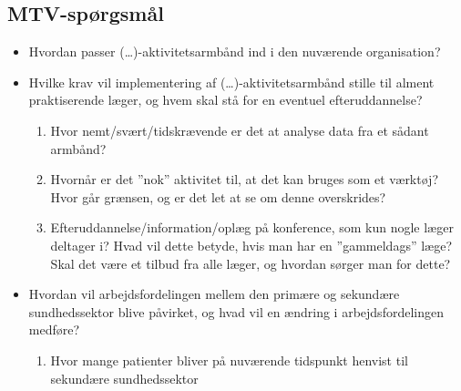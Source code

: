 \subsection{MTV-spørgsmål}
\begin{itemize}
\item Hvordan passer  (…)-aktivitetsarmbånd ind i den nuværende organisation? 
\item Hvilke krav vil implementering af (…)-aktivitetsarmbånd stille til alment praktiserende læger, og hvem skal stå for en eventuel efteruddannelse? 
\begin{enumerate}
\item Hvor nemt/svært/tidskrævende er det at analyse data fra et sådant armbånd?
\item Hvornår er det ”nok” aktivitet til, at det kan bruges som et værktøj? Hvor går grænsen, og er det let at se om denne overskrides? 
\item Efteruddannelse/information/oplæg på konference, som kun nogle læger deltager i? Hvad vil dette betyde, hvis man har en ”gammeldags” læge?  Skal det være et tilbud fra alle læger, og hvordan sørger man for dette?
\end{enumerate}
\item  Hvordan vil arbejdsfordelingen mellem den primære og sekundære sundhedssektor blive påvirket, og hvad vil en ændring i arbejdsfordelingen medføre?
\begin{enumerate}
\item Hvor mange patienter bliver på nuværende tidspunkt henvist til sekundære sundhedssektor
\end{enumerate} 
\end{itemize}